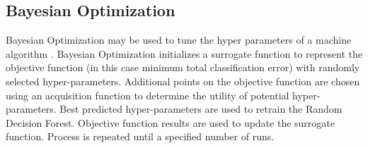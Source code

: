 \documentclass[numbered,pdftex]{ohio-etd}
\begin{document}
{{		
%
%		
%

		
		
		
	} %

	\subsection{Bayesian Optimization}\label{Bayesian_Optimization}{
		
		{Bayesian Optimization may be used to tune the hyper parameters of a machine algorithm \cite{noauthor_bayesian_nodate, snoek_practical_2012}. Bayesian Optimization initializes a surrogate function to represent the objective function (in this case minimum total classification error) with randomly selected hyper-parameters. Additional points on the objective function are chosen using an acquisition function to determine the utility of potential hyper-parameters. Best predicted hyper-parameters are used to retrain the Random Decision Forest. Objective function results are used to update the surrogate function. Process is repeated until a specified number of runs.}
		
}}
\end{document}
